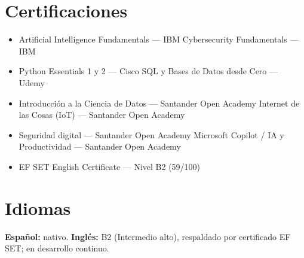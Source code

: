 \documentclass[11pt,a4paper]{article}
\begin{document}
\section{Certificaciones}
\begin{itemize}[itemsep=1pt]
  \item Artificial Intelligence Fundamentals --- IBM \hfill\textbullet\hfill Cybersecurity Fundamentals --- IBM
  \item Python Essentials 1 y 2 --- Cisco \hfill\textbullet\hfill SQL y Bases de Datos desde Cero --- Udemy
  \item Introducción a la Ciencia de Datos --- Santander Open Academy \hfill\textbullet\hfill Internet de las Cosas (IoT) --- Santander Open Academy
  \item Seguridad digital --- Santander Open Academy \hfill\textbullet\hfill Microsoft Copilot / IA y Productividad --- Santander Open Academy
  \item EF SET English Certificate --- Nivel B2 (59/100)
\end{itemize}

\section{Idiomas}
\textbf{Español:} nativo. \qquad \textbf{Inglés:} B2 (Intermedio alto), respaldado por certificado EF SET; en desarrollo continuo.
\end{document}
